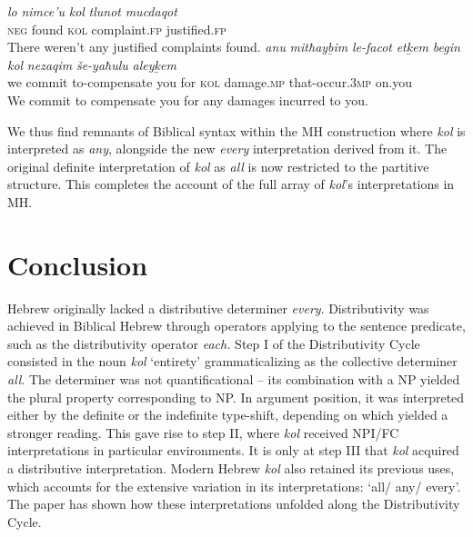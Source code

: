 \documentclass[output=paper]{langsci/langscibook}
\begin{document}
\ea%
    \label{ex:doron:60}
    \ea
    \gll \textit{lo}     \textit{nimce’u}     \textit{kol}    \textit{tlunot}              \textit{mucdaqot}\\
         \textsc{neg} found         \textsc{kol}  complaint.\textsc{fp}  justified.\textsc{fp} \\
    \glt There weren’t any justified complaints found.
    \ex
    \gll \textit{anu} \textit{mitħayḇim}  \textit{le-facot}            \textit{etḵem}  \textit{begin}  \textit{kol}   \textit{nezaqim}        \textit{še-yaħulu}            \textit{aleyḵem}   \\
         we  commit       to-compensate you       for      \textsc{kol}  damage.\textsc{mp}  that-occur.3\textsc{mp}  on.you \\
    \glt We commit to compensate you for any damages incurred to you.
    \z
\z

We thus find remnants of Biblical syntax within the MH  construction where  \textit{kol} is interpreted as \textit{any}, alongside the new \textit{every} interpretation derived from it. The original definite interpretation of \textit{kol} as \textit{all} is now restricted to the partitive  structure. This completes the account of the full array of \textit{kol}’s interpretations in MH.

\section{Conclusion}\label{sec:doron:7}%
Hebrew originally lacked a distributive determiner \textit{every}. Distributivity  \linebreak was achieved in Biblical Hebrew through operators applying to the sentence predicate, such as the distributivity operator \textit{each.} Step I of the Distributivity Cycle consisted in the noun \textit{kol} ‘entirety’ grammaticalizing as the collective determiner \textit{all}. The determiner was not quantificational – its combination with a NP yielded the plural property corresponding to NP. In argument position, it was interpreted either by the definite or the indefinite type-shift, depending on which yielded a stronger reading. This gave rise to step II, where \textit{kol} received NPI/FC interpretations in particular environments. It is only at step III that \textit{kol} acquired a distributive interpretation. Modern Hebrew \textit{kol} also retained its previous uses, which accounts for the extensive variation in its interpretations: ‘all/ any/ every’. The paper has shown how these interpretations unfolded along the Distributivity Cycle.
\end{document}
